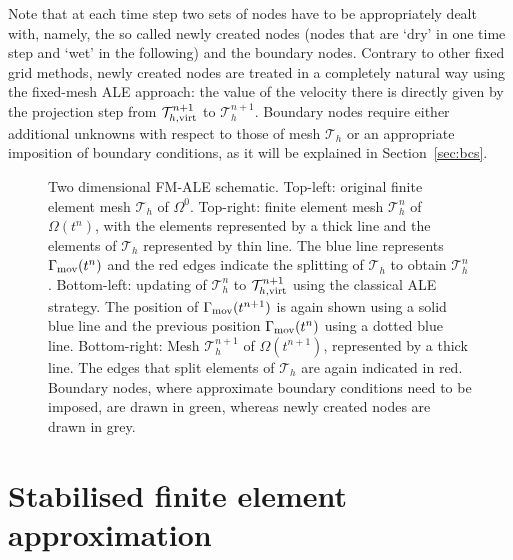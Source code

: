 \documentclass[11pt,a4paper,oneside,reqno]{amsart}
\begin{document}
Note that at each time step two sets of nodes have to be appropriately dealt with, namely, the so called newly created nodes (nodes that are `dry' in one time step and `wet' in the following) and the boundary nodes. Contrary to other fixed grid methods, newly created nodes are treated in a completely natural way using the fixed-mesh ALE approach: the value of the velocity there is directly given by the projection step from $\mathcal{T}^{n+1}_{h,\rm virt}$ to $\mathcal{T}_h^{n+1}$. Boundary nodes require either additional unknowns with respect to those of mesh $\mathcal{T}_h$ or an appropriate imposition of boundary conditions, as it will be explained in Section~\ref{sec:bcs}.

\begin{figure}[htbp]
   \centering
   \vskip10cm\hskip-6cm
   {}\hskip0.5cm
   {}\vskip0.5cm\hskip-6cm
   {}\hskip0.5cm
   {}
   \vskip-10cm
   \caption{Two dimensional FM-ALE schematic. Top-left: original finite element mesh $\mathcal{T}_h$ of $\Omega^0$.
            Top-right: finite element mesh $\mathcal{T}_h^n$ of $\Omega(t^n)$, with the elements represented by 
            a thick line and the elements of $\mathcal{T}_h$ represented by thin line. The blue line represents 
            $\Gamma_{\rm mov}(t^n)$ and the red edges indicate the splitting of $\mathcal{T}_h$ 
            to obtain $\mathcal{T}_h^n$. 
            Bottom-left: updating of $\mathcal{T}_h^n$ to $\mathcal{T}^{n+1}_{h,\rm virt}$ using the classical ALE strategy.
            The position of $\Gamma_{\rm mov}(t^{n+1})$ is again shown using a solid blue line and the
            previous position $\Gamma_{\rm mov}(t^{n})$ using a dotted blue line. Bottom-right: 
            Mesh $\mathcal{T}_h^{n+1}$ of $\Omega(t^{n+1})$, represented by a thick line. 
            The edges that split elements of $\mathcal{T}_h$ are again indicated in red. 
            Boundary nodes, where approximate boundary conditions need to
            be imposed, are drawn in green, whereas newly created nodes are drawn in grey.}
  \label{fig:fmale3}
\end{figure}

\section{Stabilised finite element approximation}\label{sec:stabfem}
\end{document}
